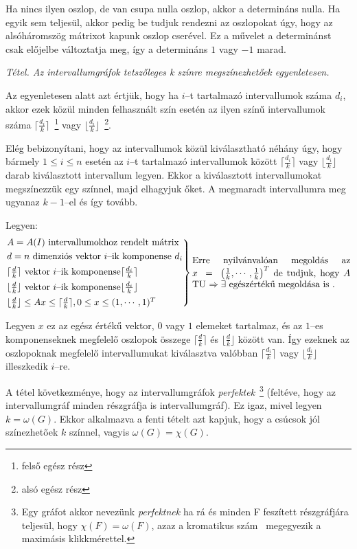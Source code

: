 Ha nincs ilyen oszlop, de van csupa nulla oszlop, akkor a determináns nulla. Ha
egyik sem teljesül, akkor pedig be tudjuk rendezni az oszlopokat úgy, hogy az
alsóháromszög mátrixot kapunk oszlop cserével. Ez a művelet a determinánst csak
előjelbe változtatja meg, így a determináns $1$ vagy $-1$ marad.
\vspace{0.4cm}

\emph{Tétel. Az intervallumgráfok tetszőleges k színre megszínezhetőek
egyenletesen.}
\vspace{0.4cm}

Az egyenletesen alatt azt értjük, hogy ha $i$--t tartalmazó intervallumok száma
$d_i$, akkor ezek közül minden felhasznált szín esetén az ilyen színű
intervallumok száma $\lceil \frac{d_i}{k} \rceil$~\footnote{felső egész rész}
vagy $\lfloor \frac{d_i}{k} \rfloor$~\footnote{alsó egész rész}.

Elég bebizonyítani, hogy az intervallumok közül kiválasztható néhány úgy, hogy
bármely $1 \leq i \leq n$ esetén az $i$--t tartalmazó intervallumok között
$\lceil \frac{d_i}{k} \rceil$ vagy $\lfloor \frac{d_i}{k} \rfloor$ darab
kiválasztott intervallum legyen. Ekkor a kiválasztott intervallumokat
megszínezzük egy színnel, majd elhagyjuk őket. A megmaradt intervallumra meg
ugyanaz $k-1$--el és így tovább.

Legyen:
\[\begin{rcases}
A=A(I) \mbox{ intervallumokhoz rendelt mátrix}\\
d = n \text{ dimenziós vektor } i \text{--ik komponense } d_i \\
\lceil \frac{d}{k} \rceil \text{ vektor } i \text{--ik komponense} \lceil \frac{d_i}{k} \rceil \\
\lfloor \frac{d}{k} \rfloor \text{ vektor } i \text{--ik komponense} \lfloor
\frac{d_i}{k} \rfloor \\
\lfloor \frac{d}{k} \rfloor \leq Ax \leq \lceil \frac{d}{k} \rceil, 0 \leq x
\leq (1,\cdots, 1)^T \end{rcases} \parbox[L]{6cm}{Erre nyilvánvalóan megoldás az
$x~=~\left( \frac{1}{k}, \cdots, \frac{1}{k} \right)^T$ de tudjuk, hogy $A$ TU
$\Rightarrow \exists$ egészértékű megoldása is .}
\]

Legyen $x$ ez az egész értékű vektor, $0$ vagy $1$ elemeket tartalmaz, és az
$1$--es komponenseknek megfelelő oszlopok összege $\lceil \frac{d}{k} \rceil$ és
$ \lfloor \frac{d}{k} \rfloor$ között van. Így ezeknek az oszlopoknak megfelelő
intervallumukat kiválasztva valóbban $\lceil \frac{d_i}{k} \rceil$ vagy $
\lfloor \frac{d_i}{k} \rfloor$ illeszkedik $i$--re.

A tétel következménye, hogy az intervallumgráfok \emph{perfektek}~\footnote{ Egy
gráfot akkor nevezünk \emph{perfektnek} ha rá és minden F feszített részgráfjára
teljesül, hogy $\chi(F) = \omega(F)$, azaz a kromatikus szám~\footnotemark{}
megegyezik a maximásis klikkmérettel.} (feltéve, hogy az intervallumgráf minden részgráfja is intervallumgráf).
Ez igaz, mivel legyen $k=\omega(G)$. Ekkor alkalmazva a fenti tételt azt kapjuk,
hogy a csúcsok jól színezhetőek $k$ színnel, vagyis $\omega(G)=\chi(G)$.